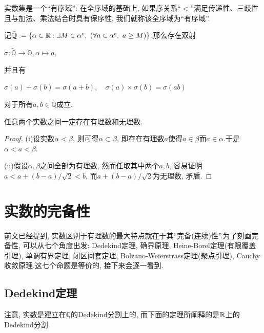 实数集是一个“有序域”: 在全序域的基础上, 如果序关系“$<$”满足传递性、三歧性且与加法、乘法结合时具有保序性, 我们就称该全序域为“有序域”. 

\begin{proposition}{}
	记$\tilde{\mathbb{Q}}: =\{ \alpha \in \mathbb{R} :  \exists M \in \alpha ^c, ~(\forall a \in \alpha ^c, ~a \geq M) \}$.那么存在双射
	\begin{center}
		$\sigma : \tilde{\mathbb{Q}} \to \mathbb{Q}, \alpha \mapsto a, $
	\end{center}
	并且有
	\begin{center}
		$\sigma (a) + \sigma (b) = \sigma (a + b), \quad \sigma (a) \times \sigma (b) = \sigma (ab)$
	\end{center}
	对于所有$a , b \in \tilde{\mathbb{Q}}$成立.
\end{proposition}

\begin{corollary}{}
	任意两个实数之间一定存在有理数和无理数.
\end{corollary}
\begin{proof}
	(i)设实数$\alpha < \beta$, 则可得$\alpha \subset \beta$, 即存在有理数$a$使得$a \in \beta$而$a \in \alpha$.于是$\alpha < a < \beta$. 
	
	(ii)假设$\alpha , \beta$之间全部为有理数, 然而任取其中两个$a, b$, 容易证明$a<a+(b-a)/\sqrt{2}<b$, 而$a+(b-a)/\sqrt{2}$为无理数, 矛盾.
\end{proof}



\newpage
\section{实数的完备性}

前文已经提到, 实数区别于有理数的最大特点就在于其“完备(连续)性”.为了刻画完备性, 可以从七个角度出发: Dedekind定理, 确界原理, Heine-Borel定理(有限覆盖引理), 单调有界定理, 闭区间套定理, Bolzano-Weierstrass定理(聚点引理), Cauchy收敛原理.这七个命题是等价的, 接下来会逐一看到.

\subsection{Dedekind定理}

注意, 实数是建立在$\mathbb{Q}$的Dedekind分割上的, 而下面的定理所阐释的是$\mathbb{R}$上的Dedekind分割.

